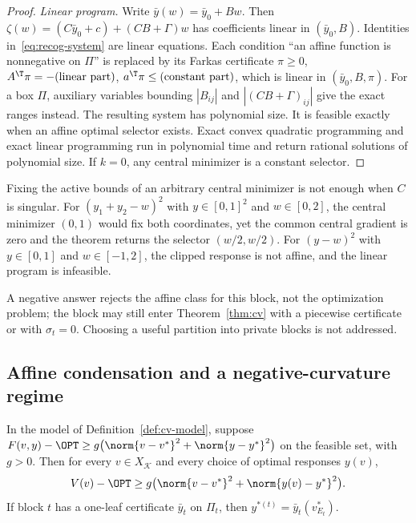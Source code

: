 \begin{proof}
\emph{Linear program.} Write $\bar y(w)=\bar y_0+Bw$. Then
$\zeta(w)=(C\bar y_0+c)+(CB+\Gamma)w$ has coefficients linear in
$(\bar y_0,B)$. Identities in~\eqref{eq:recog-system} are linear equations.
Each condition ``an affine function is nonnegative on $\Pi$'' is replaced by
its Farkas certificate $\pi\ge0$, $A^{\T}\pi=-(\text{linear part})$,
$a^{\T}\pi\le(\text{constant part})$, which is linear in $(\bar y_0,B,\pi)$.
For a box $\Pi$, auxiliary variables bounding $|B_{ij}|$ and
$|(CB+\Gamma)_{ij}|$ give the exact ranges instead. The resulting system has
polynomial size. It is feasible exactly when an affine optimal selector
exists. Exact convex quadratic programming \cite{KozlovTarasovKhachiyan1980}
and exact linear programming \cite{GrotschelLovaszSchrijver1988} run in
polynomial time and return rational solutions of polynomial size. If $k=0$,
any central minimizer is a constant selector.
\end{proof}

Fixing the active bounds of an arbitrary central minimizer is not enough
when $C$ is singular. For $(y_1+y_2-w)^2$ with $y\in[0,1]^2$ and
$w\in[0,2]$, the central minimizer $(0,1)$ would fix both coordinates, yet
the common central gradient is zero and the theorem returns the selector
$(w/2,w/2)$. For $(y-w)^2$ with $y\in[0,1]$ and $w\in[-1,2]$, the clipped
response is not affine, and the linear program is infeasible.

A negative answer rejects the affine class for this block, not the
optimization problem; the block may still enter Theorem~\ref{thm:cv} with a
piecewise certificate or with $\sigma_t=0$. Choosing a useful partition
into private blocks is not addressed.

\subsection{Affine condensation and a negative-curvature regime}

\begin{lemma}\label{lem:cv-growth}
In the model of Definition~\ref{def:cv-model}, suppose
$F(v,y)-\OPT\ge g\bigl(\norm{v-v^*}^2+\norm{y-y^*}^2\bigr)$ on the feasible
set, with $g>0$. Then for every $v\in X_{\mathcal K}$ and every choice of
optimal responses $y(v)$,
\[
V(v)-\OPT\ge g\bigl(\norm{v-v^*}^2+\norm{y(v)-y^*}^2\bigr).
\]
If block $t$ has a one-leaf certificate $\bar y_t$ on $\Pi_t$, then
$y^{*(t)}=\bar y_t(v^*_{E_t})$.
\end{lemma}

